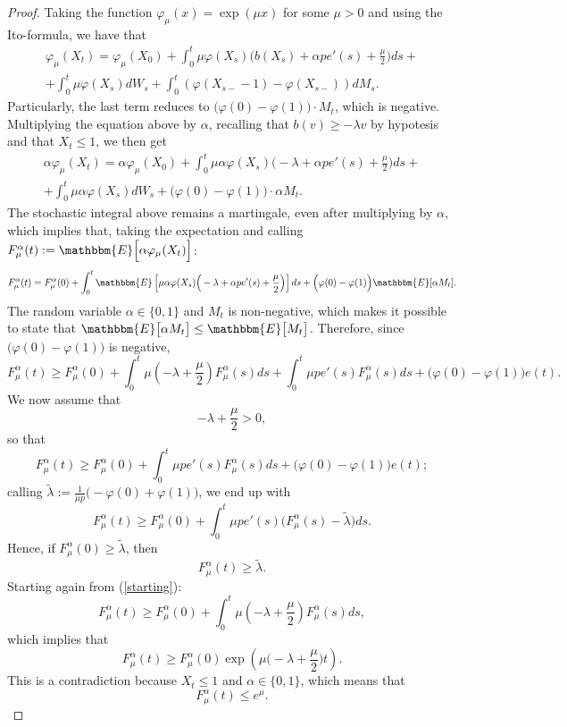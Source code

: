 \documentclass[11pt, a4paper]{article}
\begin{document}
\begin{proof}
Taking the function $\varphi_{\mu}(x) = \exp ( \mu x )$ for some $\mu > 0$ and using the Ito-formula, we have that \begin{multline*} \varphi_\mu (X_t) = \varphi_\mu (X_0) + \int_0^t \mu \varphi(X_s) \Big( b(X_s) + \alpha p e'(s) + \frac{\mu}{2} \Big) ds + \\ + \int_0^t \mu \varphi(X_s) d W_s + \int_0^t (\varphi(X_{s-} - 1) - \varphi(X_{s-})) dM_s.  \end{multline*}
Particularly, the last term reduces to $\big( \varphi(0) - \varphi(1) \big) \cdot M_t$, which is negative. Multiplying the equation above by $\alpha$, recalling that $b(v) \geq - \lambda v$ by hypotesis and that $X_t \leq 1$, we then get \begin{multline*} \alpha \varphi_\mu (X_t) = \alpha \varphi_\mu (X_0) + \int_0^t \mu \alpha \varphi(X_s) \Big( -\lambda + \alpha p e'(s) + \frac{\mu}{2} \Big) ds + \\ + \int_0^t \mu \alpha \varphi(X_s) d W_s + \big( \varphi(0) - \varphi(1) \big) \cdot \alpha M_t. \end{multline*}
The stochastic integral above remains a martingale, even after multiplying by $\alpha$, which implies that, taking the expectation and calling $F^\alpha_\mu(t) := \mathbbm{E} \Big[ \alpha \varphi_\mu (X_t) \Big]$: \[ F^\alpha_\mu(t) = F^\alpha_\mu(0) + \int_0^t \mathbbm{E} \left[ \mu \alpha \varphi(X_s) \Big( -\lambda + \alpha p e'(s) + \frac{\mu}{2} \Big) \right] ds + \Big( \varphi(0) - \varphi(1) \Big) \mathbbm{E}[\alpha M_t]. \] The random variable $\alpha \in \big\{ 0, 1 \big\}$ and $M_t$ is non-negative, which makes it possible to state that $\mathbbm{E} \big[ \alpha M_t \big] \leq \mathbbm{E} \big[ M_t \big]$. Therefore, since $\big( \varphi(0) - \varphi(1) \big)$ is negative, 
\begin{equation} 
\label{starting} F^\alpha_\mu(t) \geq F^\alpha_\mu(0) + \int_0^t \mu \left( - \lambda + \frac{\mu}{2} \right) F^\alpha_\mu(s) ds + \int_0^t \mu p e'(s) F^\alpha_\mu(s) ds + \Big( \varphi(0) - \varphi(1) \Big) e(t). \end{equation}
We now assume that \[ - \lambda + \frac{\mu}{2} > 0, \] so that \[ F^\alpha_\mu(t) \geq F^\alpha_\mu(0) + \int_0^t \mu p e'(s) F^\alpha_\mu(s) ds + \Big( \varphi(0) - \varphi(1) \Big) e(t); \] calling $\tilde{\lambda} := \frac{1}{\mu p} \big( - \varphi(0) + \varphi(1) \big)$, we end up with \[ F^\alpha_\mu(t) \geq F^\alpha_\mu(0) + \int_0^t \mu p e'(s) \Big( F^\alpha_\mu(s) - \tilde{\lambda} \Big) ds. \] Hence, if $F^\alpha_\mu(0) \geq \tilde{\lambda}$, then \[ F^\alpha_\mu(t) \geq \tilde{\lambda}. \] Starting again from (\ref{starting}): \[ F^\alpha_\mu(t) \geq F^\alpha_\mu(0) + \int_0^t \mu \left( -\lambda + \frac{\mu}{2} \right) F^\alpha_\mu(s) ds, \] which implies that \[ F^\alpha_\mu(t) \geq F^\alpha_\mu(0) \exp \left( \mu \Big( - \lambda + \frac{\mu}{2} \Big) t \right). \] This is a contradiction because $X_t \leq 1$ and $\alpha \in \{ 0, 1 \}$, which means that \[ F^\alpha_\mu (t) \leq e^\mu. \]
\end{proof}
\end{document}
